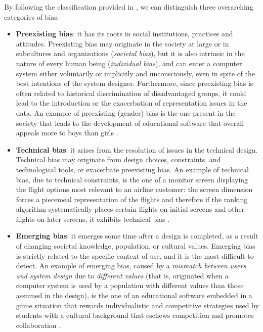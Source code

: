 By following the classification provided in \cite{friedman2017bias}, we can distinguish three overarching categories of bias:
\begin{itemize}
\item \textbf{Preexisting bias}: it has its roots in social institutions, practices and attitudes. Preexisting bias may originate in the society at large or in subcultures and organizations (\textit{societal bias}), but it is also intrinsic in the nature of every human being (\textit{individual bias}), and can enter a computer system either voluntarily or implicitly and unconsciously, even in spite of the best intentions of the system designer. Furthermore, since preexisting bias is often related to historical discrimination of disadvantaged groups, it could lead to the introduction or the exacerbation of representation issues in the data.
An example of preexisting (gender) bias is the one present in the society that leads to the development of educational software that overall appeals more to boys than girls \cite{friedman2017bias}.
\item \textbf{Technical bias}: it arises from the resolution of issues in the technical design. Technical bias may originate from design choices, constraints, and technological tools, or exacerbate preexisting bias.
An example of technical bias, due to technical constraints, is the one of a monitor screen displaying the flight options most relevant to an airline customer: the screen dimension forces a piecemeal representation of the flights and therefore if the ranking algorithm systematically places certain flights on initial screens and other flights on later screens, it exhibits technical bias \cite{friedman2017bias}.
\item \textbf{Emerging bias}: it emerges some time after a design is completed, as a result of changing societal knowledge, population, or cultural values. Emerging bias is strictly related to the specific context of use, and it is the most difficult to detect.
An example of emerging bias, caused by a \textit{mismatch between users and system design} due to \textit{different values} (that is, originated when a computer system is used by a population with different values than those assumed in the design), is the one of an educational software embedded in a game situation that rewards individualistic and competitive strategies used by students with a cultural background that eschews competition and promotes collaboration \cite{friedman2017bias}.
\end{itemize}


